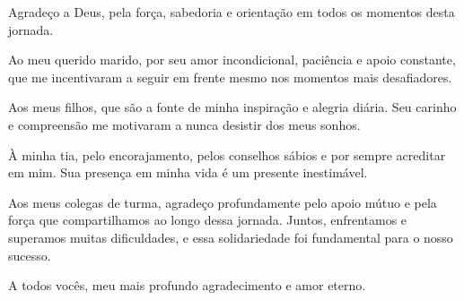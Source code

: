 
\begin{agradecimentos}
  Agradeço a Deus, pela força, sabedoria e orientação em todos os momentos desta jornada.

  Ao meu querido marido, por seu amor incondicional, paciência e apoio constante, que me incentivaram a seguir em frente mesmo nos momentos mais desafiadores.

  Aos meus filhos, que são a fonte de minha inspiração e alegria diária. Seu carinho e compreensão me motivaram a nunca desistir dos meus sonhos.

  À minha tia, pelo encorajamento, pelos conselhos sábios e por sempre acreditar em mim. Sua presença em minha vida é um presente inestimável.

  Aos meus colegas de turma, agradeço profundamente pelo apoio mútuo e pela força que compartilhamos ao longo dessa jornada. Juntos, enfrentamos e superamos muitas dificuldades, e essa solidariedade foi fundamental para o nosso sucesso.

  A todos vocês, meu mais profundo agradecimento e amor eterno.

\end{agradecimentos}